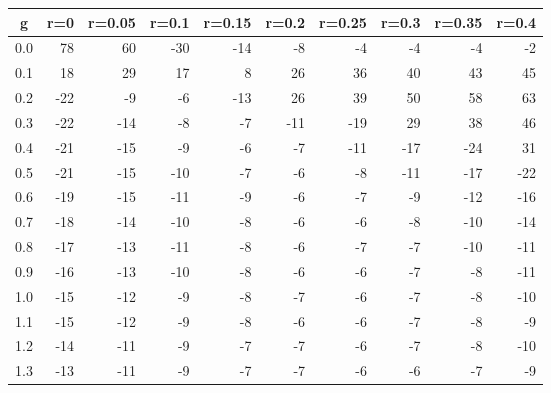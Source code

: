 %
\begin{table}[!tbp]
 \begin{center}
 \begin{tabular}{rrrrrrrrrr}\hline\hline
\multicolumn{1}{c}{g}&\multicolumn{1}{c}{r=0}&\multicolumn{1}{c}{r=0.05}&\multicolumn{1}{c}{r=0.1}&\multicolumn{1}{c}{r=0.15}&\multicolumn{1}{c}{r=0.2}&\multicolumn{1}{c}{r=0.25}&\multicolumn{1}{c}{r=0.3}&\multicolumn{1}{c}{r=0.35}&\multicolumn{1}{c}{r=0.4}\tabularnewline
\hline
0.0& 78& 60&-30&-14& -8& -4& -4& -4& -2\tabularnewline
0.1& 18& 29& 17&  8& 26& 36& 40& 43& 45\tabularnewline
0.2&-22& -9& -6&-13& 26& 39& 50& 58& 63\tabularnewline
0.3&-22&-14& -8& -7&-11&-19& 29& 38& 46\tabularnewline
0.4&-21&-15& -9& -6& -7&-11&-17&-24& 31\tabularnewline
0.5&-21&-15&-10& -7& -6& -8&-11&-17&-22\tabularnewline
0.6&-19&-15&-11& -9& -6& -7& -9&-12&-16\tabularnewline
0.7&-18&-14&-10& -8& -6& -6& -8&-10&-14\tabularnewline
0.8&-17&-13&-11& -8& -6& -7& -7&-10&-11\tabularnewline
0.9&-16&-13&-10& -8& -6& -6& -7& -8&-11\tabularnewline
1.0&-15&-12& -9& -8& -7& -6& -7& -8&-10\tabularnewline
1.1&-15&-12& -9& -8& -6& -6& -7& -8& -9\tabularnewline
1.2&-14&-11& -9& -7& -7& -6& -7& -8&-10\tabularnewline
1.3&-13&-11& -9& -7& -7& -6& -6& -7& -9\tabularnewline
\hline
\end{tabular}

\end{center}

\end{table}

